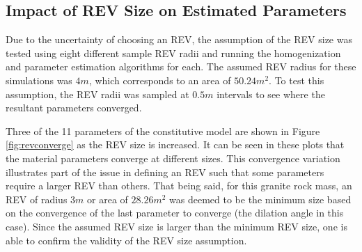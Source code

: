 \subsection{Impact of REV Size on Estimated Parameters}

Due to the uncertainty of choosing an REV, the assumption of the REV size was tested using eight different sample REV radii and running the homogenization and parameter estimation algorithms for each. The assumed REV radius for these simulations was $4m$, which corresponds to an area of $50.24 m^2$. To test this assumption, the REV radii was sampled at $0.5m$ intervals to see where the resultant parameters converged.

Three of the 11 parameters of the constitutive model are shown in Figure \ref{fig:revconverge} as the REV size is increased. It can be seen in these plots that the material parameters converge at different sizes. This convergence variation illustrates part of the issue in defining an REV such that some parameters require a larger REV than others. That being said, for this granite rock mass, an REV of radius $3m$ or area of $28.26 m^2$ was deemed to be the minimum size based on the convergence of the last parameter to converge (the dilation angle in this case). Since the assumed REV size is larger than the minimum REV size, one is able to confirm the validity of the REV size assumption.